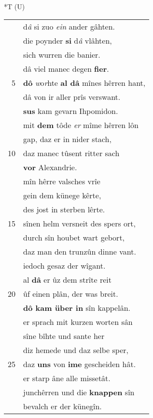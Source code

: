 \documentclass[8pt,a4paper,notitlepage]{article}
\begin{document}
\begin{table}[ht]
\begin{minipage}[t]{0.5\linewidth}
\end{minipage}
\hspace{0.5cm}
\begin{minipage}[t]{0.5\linewidth}
\small
\begin{center}*T (U)
\end{center}
\begin{tabular}{rl}
 & d\textit{â} si zuo \textit{ein} ander gâhten.\\ 
 & die poynder \textbf{si} d\textit{â} vlâhten,\\ 
 & sich wurren die banier.\\ 
 & dâ viel manec degen \textbf{fier}.\\ 
5 & \textbf{dô} \textit{w}o\textit{r}hte \textbf{al dâ} mînes hêrren hant,\\ 
 & dâ von ir aller prîs verswant.\\ 
 & \textbf{sus} kam gevarn Ihpomidon.\\ 
 & mit \textbf{dem} tôde \textit{er} mîme hêrren lôn\\ 
 & gap, daz er in nider stach,\\ 
10 & daz manec tûsent ritter sach\\ 
 & \textbf{vor} Alexandrie.\\ 
 & mîn hêrre valsches vrîe\\ 
 & gein dem künege kêrte,\\ 
 & des jost in sterben lêrte.\\ 
15 & sînen helm versneit des spers ort,\\ 
 & durch sîn houbet wart gebort,\\ 
 & daz man den trunzûn dinne vant.\\ 
 & iedoch gesaz der wîgant.\\ 
 & al \textbf{dâ} er ûz dem strîte reit\\ 
20 & ûf einen plân, der was breit.\\ 
 & \textbf{dô kam über in} sîn kappelân.\\ 
 & er sprach mit kurzen worten sân\\ 
 & sîne bîhte und sante her\\ 
 & diz hemede und daz selbe sper,\\ 
25 & daz \textbf{uns} von \textbf{ime} gescheiden hât.\\ 
 & er starp âne alle missetât.\\ 
 & junchêrren und die \textbf{knappen} sîn\\ 
 & bevalch er der künegîn.\\ 

\end{tabular}
\end{minipage}
\end{table}
\end{document}
